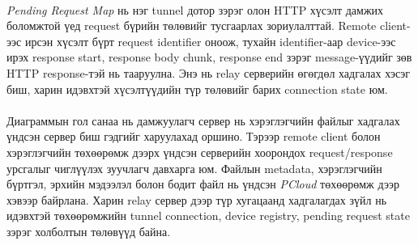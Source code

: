 \paragraph{}
\textit{Pending Request Map} нь нэг tunnel дотор зэрэг олон HTTP хүсэлт дамжих боломжтой үед request бүрийн төлөвийг тусгаарлах зориулалттай. Remote client-ээс ирсэн хүсэлт бүрт request identifier оноож, тухайн identifier-аар device-ээс ирэх response start, response body chunk, response end зэрэг message-үүдийг зөв HTTP response-тэй нь тааруулна. Энэ нь relay серверийн өгөгдөл хадгалах хэсэг биш, харин идэвхтэй хүсэлтүүдийн түр төлөвийг барих connection state юм.

\paragraph{}
Диаграммын гол санаа нь дамжуулагч сервер нь хэрэглэгчийн файлыг хадгалах үндсэн сервер биш гэдгийг харуулахад оршино. Тэрээр remote client болон хэрэглэгчийн төхөөрөмж дээрх үндсэн серверийн хоорондох request/response урсгалыг чиглүүлэх зуучлагч давхарга юм. Файлын metadata, хэрэглэгчийн бүртгэл, эрхийн мэдээлэл болон бодит файл нь үндсэн \textit{PCloud} төхөөрөмж дээр хэвээр байрлана. Харин relay сервер дээр түр хугацаанд хадгалагдах зүйл нь идэвхтэй төхөөрөмжийн tunnel connection, device registry, pending request state зэрэг холболтын төлөвүүд байна.


